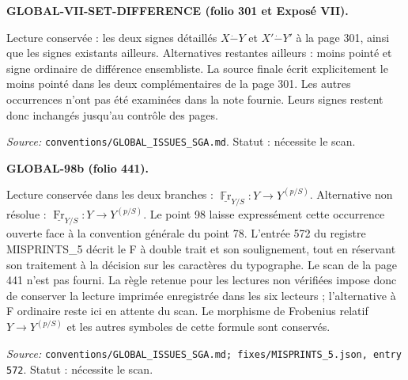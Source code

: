 \medskip\noindent\textbf{GLOBAL-VII-SET-DIFFERENCE (folio 301 et Exposé VII).}\par
Lecture conservée : les deux signes détaillés $X\mathbin{\dot{-}}Y$ et $X'\mathbin{\dot{-}}Y'$ à la page 301, ainsi que les signes existants ailleurs. Alternatives restantes ailleurs : moins pointé et signe ordinaire de différence ensembliste.
La source finale écrit explicitement le moins pointé dans les deux complémentaires de la page 301. Les autres occurrences n’ont pas été examinées dans la note fournie. Leurs signes restent donc inchangés jusqu’au contrôle des pages.
\par\noindent\textit{Source: }\texttt{conventions/GLOBAL\_ISSUES\_SGA.md}. Statut : nécessite le scan.

\medskip\noindent\textbf{GLOBAL-98b (folio 441).}\par
Lecture conservée dans les deux branches : $\underline{\operatorname{\mathbb{F}r}}_{Y/S}:Y\longrightarrow Y^{(p/S)}$. Alternative non résolue : $\underline{\operatorname{Fr}}_{Y/S}:Y\longrightarrow Y^{(p/S)}$.
Le point 98 laisse expressément cette occurrence ouverte face à la convention générale du point 78. L’entrée 572 du registre MISPRINTS\_5 décrit le F à double trait et son soulignement, tout en réservant son traitement à la décision sur les caractères du typographe. Le scan de la page 441 n’est pas fourni. La règle retenue pour les lectures non vérifiées impose donc de conserver la lecture imprimée enregistrée dans les six lecteurs ; l’alternative à F ordinaire reste ici en attente du scan. Le morphisme de Frobenius relatif $Y\to Y^{(p/S)}$ et les autres symboles de cette formule sont conservés.
\par\noindent\textit{Source: }\texttt{conventions/GLOBAL\_ISSUES\_SGA.md; fixes/MISPRINTS\_5.json, entry 572}. Statut : nécessite le scan.
\endgroup
\clearpage
